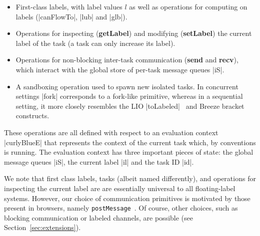 \begin{itemize}
    \item First-class labels, with label values $l$ as well as operations for computing on
labels (|canFlowTo|, |lub| and |glb|).
    \item Operations for inspecting (\textbf{getLabel}) and modifying
    (\textbf{setLabel}) the current label of the task (a task can only increase its label).
    \item Operations for non-blocking inter-task communication (\textbf{send}
    and \textbf{recv}), which interact with the global store of per-task
    message queues |iS|.
    \item A sandboxing operation used to spawn new isolated tasks. In
    concurrent settings |fork| corresponds to a fork-like primitive,
    whereas in a
    sequential setting, it more closely resembles the LIO
    |toLabeled|~\cite{lio} and Breeze
    bracket~\cite{Hritcu:2013:YIB:2497621.2498098} constructs.
\end{itemize}

These operations are all defined with respect to an evaluation context
|curlyBlueE| that represents the context of the current task which, by
conventions is running. The evaluation context has three important pieces of
state: the global message queues |iS|, the current label |il| and the task ID |id|.
 
We note that first class labels, tasks (albeit named differently), and
operations for inspecting the current label are are essentially universal to
all floating-label systems.
%
However, our choice of communication primitives is motivated by
those present in browsers, namely \texttt{postMessage}~\cite{webmessaging}.
%
Of course, other choices, such as blocking communication or labeled channels,
are possible (see Section~\ref{sec:extensions}).
%

